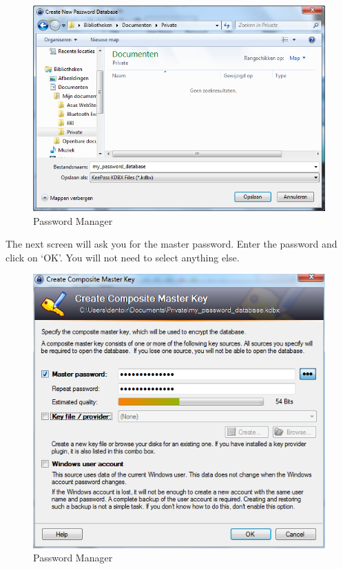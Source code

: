 \begin{figure}[htbp]
\centering
\includegraphics{mng_9.png}
\caption{Password Manager}
\end{figure}

The next screen will ask you for the master password. Enter the password
and click on `OK'. You will not need to select anything else.

\begin{figure}[htbp]
\centering
\includegraphics{mng_10.png}
\caption{Password Manager}
\end{figure}

